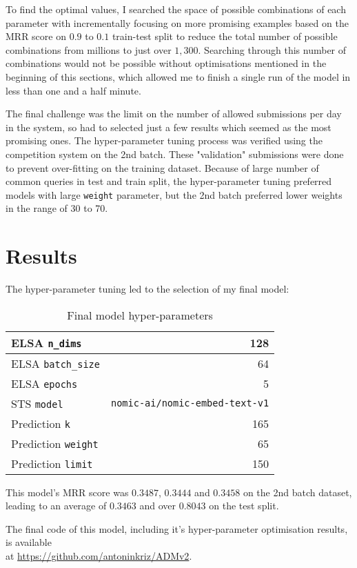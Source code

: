 \documentclass{article}
\begin{document}
To find the optimal values, I searched the space of possible combinations of each parameter with incrementally focusing on more promising examples based on the MRR score on $0.9$ to $0.1$ train-test split to reduce the total number of possible combinations from millions to just over $1,300$. Searching through this number of combinations would not be possible without optimisations mentioned in the beginning of this sections, which allowed me to finish a single run of the model in less than one and a half minute.

The final challenge was the limit on the number of allowed submissions per day in the system, so  had to selected just a few results which seemed as the most promising ones. The hyper-parameter tuning process was verified using the competition system on the 2nd batch. These "validation" submissions were done to prevent over-fitting on the training dataset. Because of large number of common queries in test and train split, the hyper-parameter tuning preferred models with large \texttt{weight} parameter, but the 2nd batch preferred lower weights in the range of 30 to 70.

\section{Results}

The hyper-parameter tuning led to the selection of my final model:
\begin{table}[!ht]
\begin{center}
    \begin{tabular}{ |l|r| } 
     \hline
     ELSA \texttt{n\_dims} & 128 \\
     \hline
     ELSA \texttt{batch\_size} & 64 \\
     \hline
     ELSA \texttt{epochs} & 5 \\
     \hline
     STS \texttt{model} & \texttt{nomic-ai/nomic-embed-text-v1} \\
     \hline
     Prediction \texttt{k} & 165 \\
     \hline
     Prediction \texttt{weight} & 65 \\
     \hline
     Prediction \texttt{limit} & 150 \\
     \hline
    \end{tabular}
    \caption{Final model hyper-parameters}
\end{center}
\end{table}

This model's MRR score was $0.3487$, $0.3444$ and $0.3458$ on the 2nd batch dataset, leading to an average of $0.3463$ and over $0.8043$ on the test split.

The final code of this model, including it's hyper-parameter optimisation results, is available\\ at \url{https://github.com/antoninkriz/ADMv2}.

\printbibliography
\end{document}
